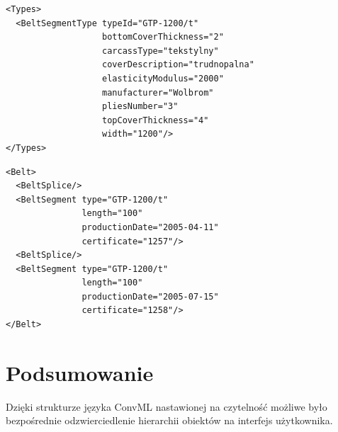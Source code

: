 \documentclass{beamer}
\begin{document}
\begin{frame}[fragile]
\begin{verbatim}
<Types>
  <BeltSegmentType typeId="GTP-1200/t"
                   bottomCoverThickness="2"
                   carcassType="tekstylny"
                   coverDescription="trudnopalna"
                   elasticityModulus="2000"
                   manufacturer="Wolbrom"
                   pliesNumber="3"
                   topCoverThickness="4"
                   width="1200"/>
</Types>
\end{verbatim}
\end{frame}

\begin{frame}[fragile]
\begin{verbatim}
<Belt>
  <BeltSplice/>
  <BeltSegment type="GTP-1200/t"
               length="100"
               productionDate="2005-04-11"
               certificate="1257"/>
  <BeltSplice/>
  <BeltSegment type="GTP-1200/t"
               length="100"
               productionDate="2005-07-15"
               certificate="1258"/>
</Belt>
\end{verbatim}
\end{frame}


\section{Podsumowanie}
\begin{frame}
Dzięki strukturze języka ConvML nastawionej na czytelność możliwe było
bezpośrednie odzwierciedlenie hierarchii obiektów na interfejs
użytkownika.
\end{frame}
\end{document}
